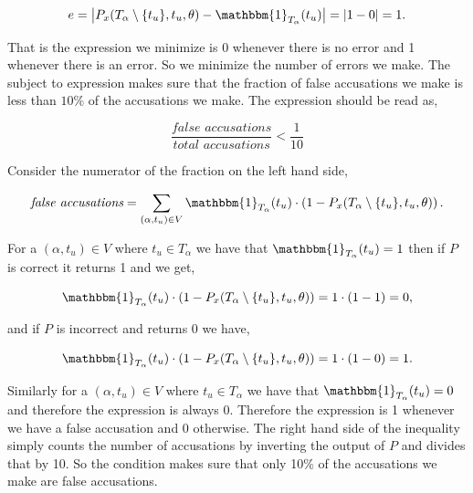 \begin{equation}
    e = \left|
        P_x(T_\alpha \setminus \{t_u\}, t_u, \theta) -
        \mathbbm{1}_{T_\alpha}(t_u)
    \right| = |1 - 0| = 1.
\end{equation}

That is the expression we minimize is 0 whenever there is no error and 1
whenever there is an error. So we minimize the number of errors we make. The
subject to expression makes sure that the fraction of false accusations we make
is less than $10\%$ of the accusations we make. The expression should be read
as,

\begin{equation}
    \frac{\textit{false accusations}}{\textit{total accusations}} < \frac{1}{10}
\end{equation}

Consider the numerator of the fraction on the left hand side,

\begin{equation}
    \textit{false accusations} = \sum_{(\alpha, t_u) \in V}
    \mathbbm{1}_{T_\alpha}(t_u) \cdot
    \left(1 - P_x(T_\alpha \setminus \{t_u\}, t_u, \theta)\right).
\end{equation}

For a $(\alpha, t_u) \in V$ where $t_u \in T_\alpha$ we have that
$\mathbbm{1}_{T_\alpha}(t_u) = 1$ then if $P$ is correct it returns 1 and we
get,

\begin{equation}
    \mathbbm{1}_{T_\alpha}(t_u) \cdot
    \left(1 - P_x(T_\alpha \setminus \{t_u\}, t_u, \theta)\right) =
    1 \cdot (1 - 1) = 0,
\end{equation}

and if $P$ is incorrect and returns 0 we have,

\begin{equation}
    \mathbbm{1}_{T_\alpha}(t_u) \cdot
    \left(1 - P_x(T_\alpha \setminus \{t_u\}, t_u, \theta)\right) =
    1 \cdot (1 - 0) = 1.
\end{equation}

Similarly for a $(\alpha, t_u) \in V$ where $t_u \in T_\alpha$ we have that
$\mathbbm{1}_{T_\alpha}(t_u) = 0$ and therefore the expression is always
0. Therefore the expression is 1 whenever we have a false accusation and 0
otherwise. The right hand side of the inequality simply counts the number of
accusations by inverting the output of $P$ and divides that by 10. So the
condition makes sure that only 10\% of the accusations we make are false
accusations.

